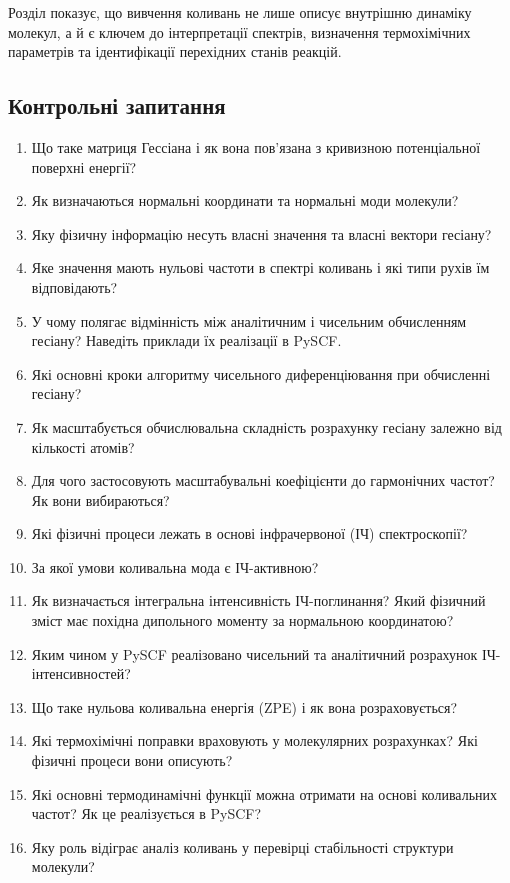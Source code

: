 Розділ показує, що вивчення коливань не лише описує внутрішню динаміку молекул,
а й є ключем до інтерпретації спектрів, визначення термохімічних параметрів
та ідентифікації перехідних станів реакцій.



\subsection*{Контрольні запитання}

\begin{enumerate}
    \item Що таке матриця Гессіана і як вона пов’язана з кривизною потенціальної поверхні енергії?
    \item Як визначаються нормальні координати та нормальні моди молекули?
    \item Яку фізичну інформацію несуть власні значення та власні вектори гесіану?
    \item Яке значення мають нульові частоти в спектрі коливань і які типи рухів їм відповідають?
    \item У чому полягає відмінність між аналітичним і чисельним обчисленням гесіану? Наведіть приклади їх реалізації в PySCF.
    \item Які основні кроки алгоритму чисельного диференціювання при обчисленні гесіану?
    \item Як масштабується обчислювальна складність розрахунку гесіану залежно від кількості атомів?
    \item Для чого застосовують масштабувальні коефіцієнти до гармонічних частот? Як вони вибираються?
    \item Які фізичні процеси лежать в основі інфрачервоної (ІЧ) спектроскопії?
    \item За якої умови коливальна мода є ІЧ-активною?
    \item Як визначається інтегральна інтенсивність ІЧ-поглинання? Який фізичний зміст має похідна дипольного моменту за нормальною координатою?
    \item Яким чином у PySCF реалізовано чисельний та аналітичний розрахунок ІЧ-інтенсивностей?
    \item Що таке нульова коливальна енергія (ZPE) і як вона розраховується?
    \item Які термохімічні поправки враховують у молекулярних розрахунках? Які фізичні процеси вони описують?
    \item Які основні термодинамічні функції можна отримати на основі коливальних частот? Як це реалізується в PySCF?
    \item Яку роль відіграє аналіз коливань у перевірці стабільності структури молекули?
\end{enumerate}

